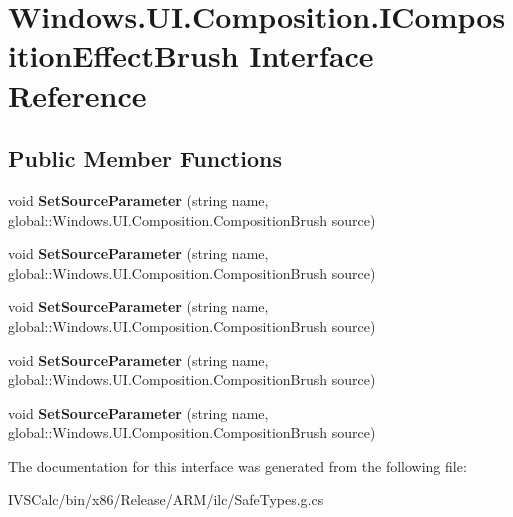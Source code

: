 \hypertarget{interface_windows_1_1_u_i_1_1_composition_1_1_i_composition_effect_brush}{}\section{Windows.\+U\+I.\+Composition.\+I\+Composition\+Effect\+Brush Interface Reference}
\label{interface_windows_1_1_u_i_1_1_composition_1_1_i_composition_effect_brush}
\subsection*{Public Member Functions}
\begin{DoxyCompactItemize}
\item 
\mbox{\label{interface_windows_1_1_u_i_1_1_composition_1_1_i_composition_effect_brush_ad614842196d83740eec1a359f68aae73}} 
void {\bfseries Set\+Source\+Parameter} (string name, global\+::\+Windows.\+U\+I.\+Composition.\+Composition\+Brush source)
\item 
\mbox{\label{interface_windows_1_1_u_i_1_1_composition_1_1_i_composition_effect_brush_ad614842196d83740eec1a359f68aae73}} 
void {\bfseries Set\+Source\+Parameter} (string name, global\+::\+Windows.\+U\+I.\+Composition.\+Composition\+Brush source)
\item 
\mbox{\label{interface_windows_1_1_u_i_1_1_composition_1_1_i_composition_effect_brush_ad614842196d83740eec1a359f68aae73}} 
void {\bfseries Set\+Source\+Parameter} (string name, global\+::\+Windows.\+U\+I.\+Composition.\+Composition\+Brush source)
\item 
\mbox{\label{interface_windows_1_1_u_i_1_1_composition_1_1_i_composition_effect_brush_ad614842196d83740eec1a359f68aae73}} 
void {\bfseries Set\+Source\+Parameter} (string name, global\+::\+Windows.\+U\+I.\+Composition.\+Composition\+Brush source)
\item 
\mbox{\label{interface_windows_1_1_u_i_1_1_composition_1_1_i_composition_effect_brush_ad614842196d83740eec1a359f68aae73}} 
void {\bfseries Set\+Source\+Parameter} (string name, global\+::\+Windows.\+U\+I.\+Composition.\+Composition\+Brush source)
\end{DoxyCompactItemize}


The documentation for this interface was generated from the following file\+:\begin{DoxyCompactItemize}
\item 
I\+V\+S\+Calc/bin/x86/\+Release/\+A\+R\+M/ilc/Safe\+Types.\+g.\+cs\end{DoxyCompactItemize}

